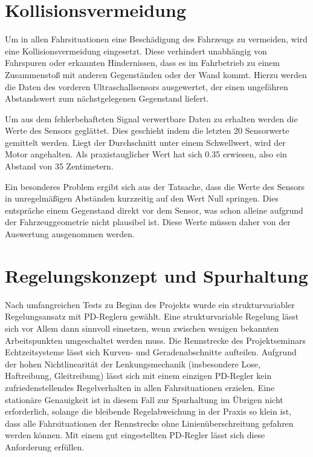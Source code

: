 \section{Kollisionsvermeidung}
\label{sec:kollision}

Um in allen Fahrsituationen eine Beschädigung des Fahrzeugs zu vermeiden, wird eine Kollisionsvermeidung eingesetzt. Diese verhindert unabhängig von Fahrspuren oder erkannten Hindernissen, dass es im Fahrbetrieb zu einem Zusammenstoß mit anderen Gegenständen oder der Wand kommt. Hierzu werden die Daten des vorderen Ultraschallsensors ausgewertet, der einen ungefähren Abstandswert zum nächstgelegenen Gegenstand liefert.

Um aus dem fehlerbehafteten Signal verwertbare Daten zu erhalten werden die Werte des Sensors geglättet. Dies geschieht indem die letzten 20 Sensorwerte gemittelt werden. Liegt der Durchschnitt unter einem Schwellwert, wird der Motor angehalten. Als praxistauglicher Wert hat sich 0.35 erwiesen, also ein Abstand von 35 Zentimetern.

Ein besonderes Problem ergibt sich aus der Tatsache, dass die Werte des Sensors in unregelmäßigen Abständen kurzzeitig auf den Wert Null springen. Dies entspräche einem Gegenstand direkt vor dem Sensor, was schon alleine aufgrund der Fahrzeuggeometrie nicht plausibel ist. Diese Werte müssen daher von der Auswertung ausgenommen werden.


\section{Regelungskonzept und Spurhaltung}
\label{sec:wallfollower}

Nach umfangreichen Tests zu Beginn des Projekts wurde ein strukturvariabler Regelungsansatz mit PD-Reglern gewählt. Eine strukturvariable Regelung lässt sich vor Allem dann sinnvoll einsetzen, wenn zwischen wenigen bekannten Arbeitspunkten umgeschaltet werden muss. Die Rennstrecke des Projektseminars Echtzeitsysteme lässt sich Kurven- und Geradenabschnitte aufteilen. Aufgrund der hohen Nichtlinearität der Lenkungsmechanik (insbesondere Lose, Haftreibung, Gleitreibung) lässt sich mit einem einzigen PD-Regler kein zufriedenstellendes Regelverhalten in allen Fahrsituationen erzielen. Eine stationäre Genauigkeit ist in diesem Fall zur Spurhaltung im Übrigen nicht erforderlich, solange die bleibende Regelabweichung in der Praxis so klein ist, dass alle Fahrsituationen der Rennstrecke ohne Linienüberschreitung gefahren werden können. Mit einem gut eingestellten PD-Regler lässt sich diese Anforderung erfüllen.

